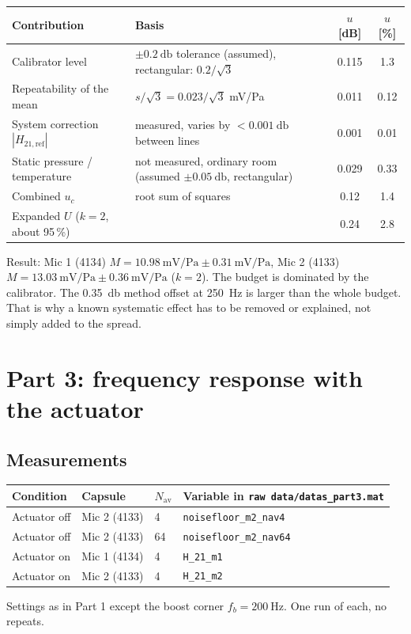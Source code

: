 \documentclass[a4paper,10pt]{article}
\newcommand{\file}[1]{\nolinkurl{#1}}
\begin{document}
\begin{table}[H]\centering\small
\begin{tabularx}{\linewidth}{@{}lXcc@{}}\toprule
Contribution & Basis & $u$ [dB] & $u$ [\%]\\\midrule
Calibrator level & $\pm\SI{0.2}{\decibel}$ tolerance (assumed), rectangular: $0.2/\sqrt3$ & 0.115 & 1.3\\
Repeatability of the mean & $s/\sqrt{3}=0.023/\sqrt3$ mV/Pa & 0.011 & 0.12\\
System correction $|H_{21,\mathrm{ref}}|$ & measured, varies by $<\SI{0.001}{\decibel}$ between lines & 0.001 & 0.01\\
Static pressure / temperature & not measured, ordinary room (assumed $\pm\SI{0.05}{\decibel}$, rectangular) & 0.029 & 0.33\\\midrule
Combined $u_c$ & root sum of squares & 0.12 & 1.4\\
Expanded $U$ ($k=2$, about 95\,\%) & & 0.24 & 2.8\\\bottomrule
\end{tabularx}
\end{table}
Result: Mic 1 (4134) $M = \SI{10.98}{\milli\volt\per\pascal} \pm \SI{0.31}{\milli\volt\per\pascal}$,
Mic 2 (4133) $M = \SI{13.03}{\milli\volt\per\pascal} \pm \SI{0.36}{\milli\volt\per\pascal}$ ($k=2$).
The budget is dominated by the calibrator. The \SI{0.35}{\decibel} method offset at
\SI{250}{\hertz} is larger than the whole budget. That is why a known systematic effect
has to be removed or explained, not simply added to the spread.

\section{Part 3: frequency response with the actuator}
\subsection{Measurements}
\begin{table}[H]\centering\small
\begin{tabularx}{\linewidth}{@{}lllX@{}}\toprule
Condition & Capsule & $N_{\mathrm{av}}$ & Variable in \file{raw data/datas_part3.mat} \\\midrule
Actuator off & Mic 2 (4133) & 4 & \file{noisefloor_m2_nav4} \\
Actuator off & Mic 2 (4133) & 64 & \file{noisefloor_m2_nav64} \\
Actuator on & Mic 1 (4134) & 4 & \file{H_21_m1} \\
Actuator on & Mic 2 (4133) & 4 & \file{H_21_m2} \\\bottomrule
\end{tabularx}
\end{table}
Settings as in Part 1 except the boost corner $f_b=\SI{200}{\hertz}$. One run of each,
no repeats.
\end{document}

